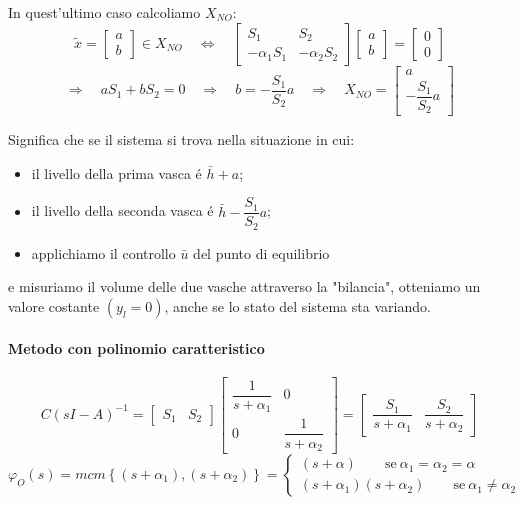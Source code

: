 \documentclass[../main.tex]{subfiles}
\begin{document}
\begin{mdframed}[style=Exercise]
\begin{Exercise}[title={Studiare l'osservabilit\'a di due vasche in parallelo}]
					In quest'ultimo caso calcoliamo $ X_{NO} $:
					\[
						\tilde x =
						\begin{bmatrix}
							a\\
							b
						\end{bmatrix} \in X_{NO}
						\quad\Leftrightarrow\quad 
						\begin{bmatrix}
							S_1 & S_2\\
							-\alpha_1 S_1 & -\alpha_2 S_2
						\end{bmatrix}
						\begin{bmatrix}
							a\\
							b
						\end{bmatrix} =
						\begin{bmatrix}
							0\\
							0
						\end{bmatrix}
					\]
					\[
						\Rightarrow\quad aS_1 + bS_2 = 0 \quad\Rightarrow\quad b = -\dfrac{S_1}{S_2}a \quad\Rightarrow\quad X_{NO} =
						\begin{bmatrix}
							a\\
							-\dfrac{S_1}{S_2}a
						\end{bmatrix}
					\]
					
					Significa che se il sistema si trova nella situazione in cui:
					\begin{itemize}
						\item 
							il livello della prima vasca \'e $ \bar h + a $;
						\item 
							il livello della seconda vasca \'e $ \bar h - \dfrac{S_1}{S_2}a $;
						\item 
							applichiamo il controllo $ \bar u $ del punto di equilibrio
					\end{itemize}
					e misuriamo il volume delle due vasche attraverso la "bilancia", otteniamo un valore costante $ (y_l = 0) $, anche se lo stato del sistema sta variando.
					
				\paragraph{Metodo con polinomio caratteristico}
					\[
						C(sI-A)^{-1} =
						\begin{bmatrix}
							S_1 & S_2
						\end{bmatrix}
						\begin{bmatrix}
							\dfrac{1}{s+\alpha_1} & 0\\
							0 & \dfrac{1}{s+\alpha_2}
						\end{bmatrix} =
						\begin{bmatrix}
							\dfrac{S_1}{s+\alpha_1} & \dfrac{S_2}{s+\alpha_2}
						\end{bmatrix}
					\]
					\[
						\varphi_O(s) = mcm\left\lbrace (s+\alpha_1), (s+\alpha_2) \right\rbrace =
						\begin{cases}
							(s+\alpha) \qquad\text{se}\ \alpha_1 = \alpha_2 = \alpha\\
							(s+\alpha_1)(s+\alpha_2) \qquad\text{se}\ \alpha_1 \neq \alpha_2
						\end{cases}
					\]
					

\end{Exercise}
\end{mdframed}
\end{document}
